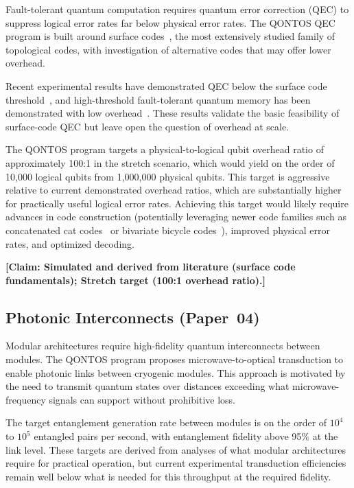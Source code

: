 \documentclass[conference]{IEEEtran}
\begin{document}
Fault-tolerant quantum computation requires quantum error correction (QEC) to suppress logical error rates far below physical error rates. The QONTOS QEC program is built around surface codes~\cite{fowler2012}, the most extensively studied family of topological codes, with investigation of alternative codes that may offer lower overhead.

Recent experimental results have demonstrated QEC below the surface code threshold~\cite{googleqai2024}, and high-threshold fault-tolerant quantum memory has been demonstrated with low overhead~\cite{bravyi2024}. These results validate the basic feasibility of surface-code QEC but leave open the question of overhead at scale.

The QONTOS program targets a physical-to-logical qubit overhead ratio of approximately 100:1 in the stretch scenario, which would yield on the order of 10,000 logical qubits from 1,000,000 physical qubits. This target is aggressive relative to current demonstrated overhead ratios, which are substantially higher for practically useful logical error rates. Achieving this target would likely require advances in code construction (potentially leveraging newer code families such as concatenated cat codes~\cite{chamberland2022} or bivariate bicycle codes~\cite{bravyi2024}), improved physical error rates, and optimized decoding.

\textbf{[Claim: Simulated and derived from literature (surface code fundamentals); Stretch target (100:1 overhead ratio).]}

\subsection{Photonic Interconnects (Paper~04)}

Modular architectures require high-fidelity quantum interconnects between modules. The QONTOS program proposes microwave-to-optical transduction to enable photonic links between cryogenic modules. This approach is motivated by the need to transmit quantum states over distances exceeding what microwave-frequency signals can support without prohibitive loss.

The target entanglement generation rate between modules is on the order of $10^4$ to $10^5$ entangled pairs per second, with entanglement fidelity above 95\% at the link level. These targets are derived from analyses of what modular architectures require for practical operation, but current experimental transduction efficiencies remain well below what is needed for this throughput at the required fidelity.
\end{document}
